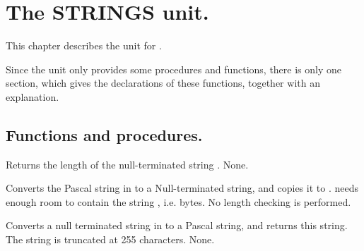 %
%
%
%
%
\chapter{The STRINGS unit.}
This chapter describes the  unit for 
\fpk. 

Since the unit only provides some procedures and functions, there is
only one section, which gives the declarations of these functions, together
with an explanation. 

\section{Functions and procedures.}

{
Returns the length of the null-terminated string .
}
{None.}{}



{
Converts the Pascal string in  to a Null-terminated 
string, and copies it to .  needs enough room to contain
the string , i.e.  bytes.
}
{No length checking is performed.}{ }



{
Converts a null terminated string in  to a Pascal string, and returns
this string. The string is truncated at 255 characters.
}
{None.}{ }



